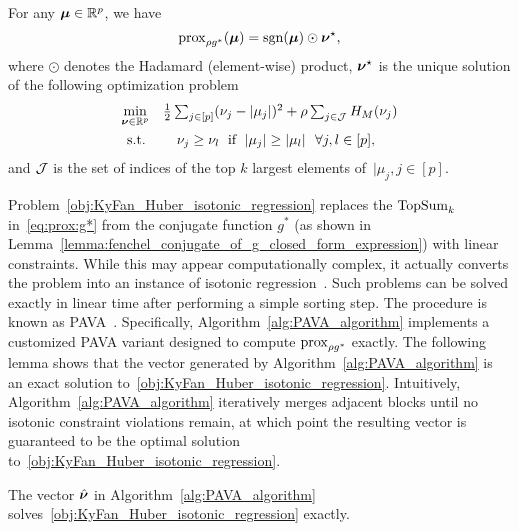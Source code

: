 \begin{lemma}
    \label{lemma:equivalence_between_proximal_operator_and_huber_isotonic_regression}
    For any $\bm{\mu} \in \mathbb{R}^p$, we have 
    $$\operatorname{prox}_{\rho g^*}(\bm{\mu}) = \operatorname{sgn}(\bm{\mu}) \odot \bm{\nu}^\star, $$ 
    where $\odot$ denotes the Hadamard (element-wise) product, $\bm{\nu}^\star$ is the unique solution of the following optimization problem
    \begin{align}
        \label{obj:KyFan_Huber_isotonic_regression}
        \begin{array}{cl}
            \min\limits_{\bm{\nu} \in \mathbb{R}^p} & \frac{1}{2} \sum_{j \in [p]} (\nu_j - \lvert \mu_j \rvert)^2 + \rho \sum_{j \in \mathcal{J}} H_M (\nu_j) \\[2ex]
            \operatorname{s.\!t.\!} & \quad \nu_j \geq \nu_l \; \text{ if } \; \lvert \mu_j \rvert \geq \lvert \mu_l \rvert ~~ \forall j, l \in [p],
        \end{array} 
    \end{align}
    and $\mathcal{J}$ is the set of indices of the top $k$ largest elements of~$ \vert{\mu_j}, j \in [p]$. 
\end{lemma}
Problem~\eqref{obj:KyFan_Huber_isotonic_regression} replaces the $\operatorname{TopSum}_k$ in~\eqref{eq:prox:g*} from the conjugate function $g^*$ (as shown in Lemma~\ref{lemma:fenchel_conjugate_of_g_closed_form_expression}) with linear constraints.
While this may appear computationally complex, it actually converts the problem into an instance of isotonic regression~\citep{best1990active}. Such problems can be solved exactly in linear time after performing a simple sorting step.
The procedure is known as PAVA~\citep{busing2022monotone}. Specifically, Algorithm~\ref{alg:PAVA_algorithm} implements a customized PAVA variant designed to compute $\operatorname{prox}_{\rho g^*}$ exactly.
The following lemma shows that the vector generated by Algorithm~\ref{alg:PAVA_algorithm} is an exact solution to~\eqref{obj:KyFan_Huber_isotonic_regression}.
Intuitively, Algorithm~\ref{alg:PAVA_algorithm} iteratively merges adjacent blocks until no isotonic constraint violations remain, at which point the resulting vector is guaranteed to be the optimal solution to~\eqref{obj:KyFan_Huber_isotonic_regression}.

\begin{lemma}
    \label{lemma:PAVA_algorithm_exact_solution}
    The vector $\hat {\bm{\nu}}$ in Algorithm~\ref{alg:PAVA_algorithm} solves~\eqref{obj:KyFan_Huber_isotonic_regression} exactly.
\end{lemma}

